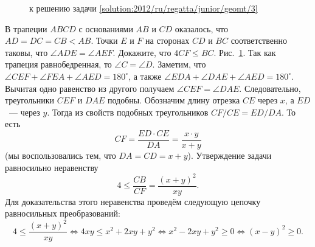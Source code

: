 \ifsolution
\begin{figure}\centering
    \caption{к решению задачи \ref{solution:2012/ru/regatta/junior/geomt/3}}
    \label{fig:solution:2012/ru/regatta/junior/geomt/3}
\end{figure}%
\fi %

\problem
В трапеции $ABCD$ с основаниями $AB$ и $CD$ оказалось, что $AD = DC = CB < AB$.
Точки $E$ и $F$ на сторонах $CD$ и $BC$ соответственно таковы, что
$\angle ADE = \angle AEF$.
Докажите, что $4 CF \leq BC$.
\solution
\label{solution:2012/ru/regatta/junior/geomt/3}%
Рис.~\ref{fig:solution:2012/ru/regatta/junior/geomt/3}.
Так как трапеция равнобедренная, то $\angle C = \angle D$.
Заметим, что
$\angle CEF + \angle FEA + \angle AED = 180^\circ$, а также
$\angle EDA + \angle DAE + \angle AED = 180^\circ$.
Вычитая одно равенство из другого получаем $\angle CEF = \angle DAE$.
Следовательно, треугольники $CEF$ и $DAE$ подобны.
Обозначим длину отрезка $CE$ через $x$, а $ED$~--- через $y$.
Тогда из свойств подобных треугольников $CF / CE = ED / DA$.
То есть
\[
    CF = \frac{ED \cdot CE}{DA} = \frac{x \cdot y}{x + y}
\]
(мы воспользовались тем, что $DA = CD = x + y$).
Утверждение задачи равносильно неравенству
\[
    4 \leq \frac{CB}{CF} = \frac{(x + y)^2}{xy}
.\]
Для доказательства этого неравенства проведём следующую цепочку равносильных
преобразований:
\[
    4 \leq \frac{(x + y)^2}{xy}
\Leftrightarrow
    4 x y \leq x^2 + 2 x y + y^2
\Leftrightarrow
    x^2 - 2 x y + y^2 \geq 0
\Leftrightarrow
    (x - y)^2 \geq 0
.\]
\endproblem
